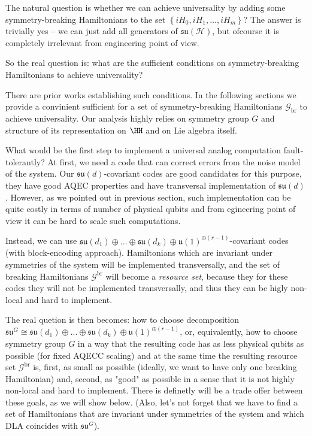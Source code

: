 \documentclass[twocolumn,superscriptaddress,aps,showpacs,amsmath,amstex,amssymb,citeautoscript,floatfix,pra,preprintnumbers]{revtex4-2}
\newcounter{alg}
\theoremstyle{plain}
\theoremstyle{plain}
\theoremstyle{plain}
\theoremstyle{plain}
\theoremstyle{plain}
\theoremstyle{plain}
\begin{document}
The natural question is whether we can achieve universality by adding some symmetry-breaking Hamiltonians to the set $\left\{i H_0, i H_1, \ldots, i H_m\right\}$?
The answer is trivially yes -- we can just add all generators of $\mathfrak{su}(\mathcal{H})$,
but ofcourse it is completely irrelevant from engineering point of view.

So the real question is: what are the sufficient conditions on symmetry-breaking Hamiltonians to achieve universality?

There are prior works establishing such conditions.
In the following sections we provide a convinient sufficient for a set of symmetry-breaking Hamiltonians $\mathcal{G}_\text{br}$ to achieve universality.
Our analysis highly relies on symmetry group $G$ and structure of its representation on $\HH$ and on Lie algebra itself.

What would be the first step to implement a universal analog computation fault-tolerantly? 
At first, we need a code that can correct errors from the noise model of the system. 
Our $\mathfrak{su}(d)$-covariant codes are good candidates for this purpose, they have good AQEC properties 
and have transversal implementation of $\mathfrak{su}(d)$. However,
as we pointed out in previous section, such implementation
can be quite costly in terms of number of physical qubits and from 
egineering point of view it can be hard to scale such computations. 

Instead, we can use $\mathfrak{su}(d_1)\oplus...\oplus\mathfrak{su}(d_k)\oplus \mathfrak{u}(1)^{\oplus(r-1)}$-covariant codes (with block-encoding approach).
Hamiltonians which are invariant under symmetries of the system will be implemented transversally, and
the set of breaking Hamiltonians $\mathcal{G}^{\text{br}}$ will become
a \textit{resource set}, because they for these codes they will not be implemented transversally, 
and thus they can be higly non-local and hard to implement.

The real quetion is then becomes: how to choose decomposition $\mathfrak{su}^G\cong \mathfrak{su}(d_1)\oplus...\oplus\mathfrak{su}(d_k)\oplus \mathfrak{u}(1)^{\oplus(r-1)}$,
or, equivalently, how to choose symmetry group $G$ in a way that the resulting code
has as less physical qubits as possible (for fixed AQECC scaling) and at the same time the resulting resource set $\mathcal{G}^{\text{br}}$ 
is, first, as small as possible (ideally, we want to have only one breaking Hamiltonian) and, second, as "good" as possible in a sense
that it is not highly non-local and hard to implement. There is definetly 
will be a trade offer between these goals, as we will show below.
(Also, let's not forget that we have to find a set of Hamiltonians that are invariant under symmetries of the system and
which DLA coincides with $\mathfrak{su}^G$).
\end{document}
